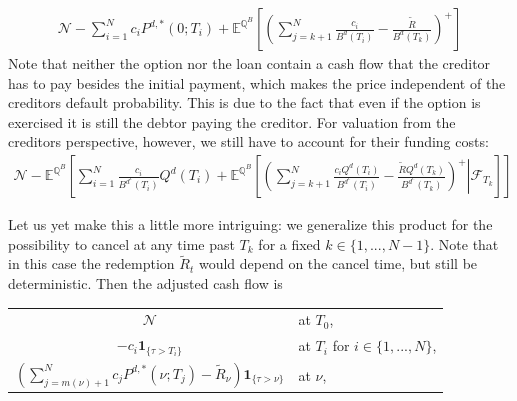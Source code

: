 \documentclass[12pt]{article}
\begin{document}
	\begin{align}\label{eq:priceofcancellableloan}
		\mathcal{N} -\sum_{i=1}^{N}c_iP^{d,*}(0;T_i) +  \mathbb{E}^{\mathbb{Q}^B}\left[\left(\sum_{j=k+1}^{N}\frac{c_i }{B^{d}(T_i)} - \frac{\tilde{R}}{B^{d}(T_k)}\right)^+\right]
	\end{align}
	Note that neither the option nor the loan contain a cash flow that the creditor has to pay besides the initial payment, which makes the price independent of the creditors default probability. This is due to the fact that even if the option is exercised it is still the debtor paying the creditor. For valuation from the creditors perspective, however, we still have to account for their funding costs:
	\begin{align}\label{eq:valueofcancellableloancreditordefault}
		\mathcal{N} - \mathbb{E}^{\mathbb{Q}^B}\left[\sum_{i=1}^{N}\frac{c_i}{B^{d^c}(T_i)}Q^d(T_i) +  \mathbb{E}^{\mathbb{Q}^B}\left[\left.\left(\sum_{j=k+1}^{N}\frac{c_i Q^d(T_i)}{B^{d^c}(T_i)} - \frac{\tilde{R}Q^d(T_k)}{B^{d^c}(T_k)}\right)^+ \right| \mathcal{F}_{T_k}\right]\right]
	\end{align}
	
	Let us yet make this a little more intriguing: we generalize this product for the possibility to cancel at any time past $T_k$ for a fixed $k \in \{1,...,N-1\}$.
	Note that in this case the redemption $\tilde{R}_t$ would depend on the cancel time, but still be deterministic. Then the adjusted cash flow is
	
	\begin{center}
		\begin{tabular}{cl}
			$\mathcal{N}$ & at $T_0$, \\
			$-c_i\mathbf{1}_{\{\tau > T_i\}}$ 		  & at $T_i$ for $i \in \{1, ..., N\}$, \\
			$\left(\sum_{j=m(\nu)+1}^{N}c_jP^{d,*}(\nu;T_j) - \tilde{R}_\nu\right)\mathbf{1}_{\{\tau > \nu\}}$
			& at $\nu$,
		\end{tabular}
	\end{center}
	
\end{document}
